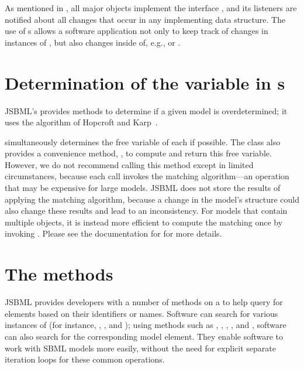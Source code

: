 As mentioned in , all major objects implement
the interface \TreeNode, and its listeners are notified about all changes
that occur in any implementing data structure. The use of
\TreeNodeChangeListener{}s allows a software application not only to keep
track of changes in instances of \SBase, but also changes inside of, e.g.,
\CVTerm or \History.


\section{Determination of the variable in s}

JSBML's \OverdeterminationValidator provides methods to determine if a given
model is overdetermined; it uses the
algorithm of Hopcroft and Karp~\cite{Hopcroft1973}.

\OverdeterminationValidator simultaneously determines the free variable of
each \AlgebraicRule if possible. The class \AlgebraicRule also provides a
convenience method, , to compute and return this
free variable.  However, we do not recommend calling this method except in
limited circumstances, because each call invokes the matching algorithm---an
operation that may be expensive for large models. JSBML does not store the
results of applying the matching algorithm, because a change in the model's
structure could also change these results and lead to an inconsistency.  For
models that contain multiple \AlgebraicRule objects, it is instead more
efficient to compute the matching once by invoking
\OverdeterminationValidator. Please see the documentation for \AlgebraicRule
for more details.


\section{The  methods}
\label{sec:find-methods}

JSBML provides developers with a number of  methods
%
on a \Model to help query for elements based on their identifiers or
names. Software can search for various instances of  (for
instance, \CallableSBase, \NamedSBase, and \NamedSBaseWithDerivedUnit);
using methods such as , ,
, , and ,
software can also search for the corresponding model element.  They enable
software to work with SBML models more easily, without the need for
explicit separate iteration loops for these common operations.

